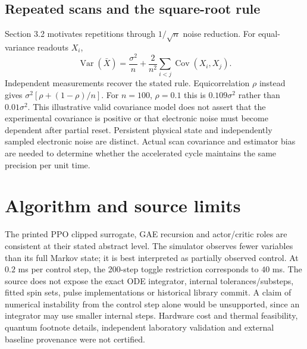 \documentclass[10pt]{article}
\begin{document}
\subsection*{Repeated scans and the square-root rule}
Section 3.2 motivates repetitions through \(1/\sqrt n\) noise reduction. For equal-variance readouts \(X_i\), \[\operatorname{Var}(\bar X)=\frac{\sigma^2}{n}
 +\frac{2}{n^2}\sum_{i<j}\operatorname{Cov}(X_i,X_j).\] Independent measurements recover the stated rule. Equicorrelation \(\rho\) instead gives \(\sigma^2[\rho+(1-\rho)/n]\). For \(n=100\), \(\rho=0.1\) this is \(0.109\sigma^2\) rather than \(0.01\sigma^2\). This illustrative valid covariance model does not assert that the experimental covariance is positive or that electronic noise must become dependent after partial reset. Persistent physical state and independently sampled electronic noise are distinct. Actual scan covariance and estimator bias are needed to determine whether the accelerated cycle maintains the same precision per unit time.\par
\section*{Algorithm and source limits}
The printed PPO clipped surrogate, GAE recursion and actor/critic roles are consistent at their stated abstract level. The simulator observes fewer variables than its full Markov state; it is best interpreted as partially observed control. At \(0.2\) ms per control step, the 200-step toggle restriction corresponds to \(40\) ms. The source does not expose the exact ODE integrator, internal tolerances/substeps, fitted spin sets, pulse implementations or historical library commit. A claim of numerical instability from the control step alone would be unsupported, since an integrator may use smaller internal steps. Hardware cost and thermal feasibility, quantum footnote details, independent laboratory validation and external baseline provenance were not certified.\par
\end{document}

